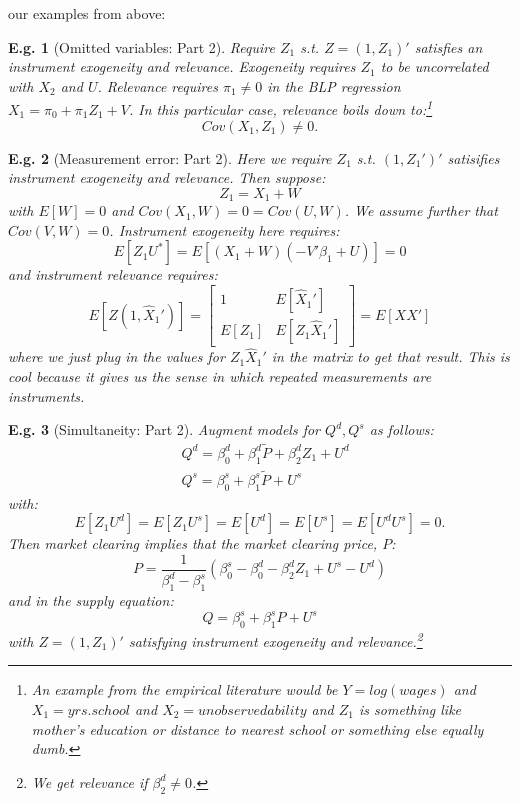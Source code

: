 \documentclass{tufte-book}
\theoremstyle{mytheoremstyle}
\theoremstyle{mylemstyle}
\theoremstyle{mydefstyle}
\newtheorem*{ex}{E.g.}
\begin{document}
 our examples from above:
\begin{ex}[Omitted variables: Part 2] Require \(Z_1\) s.t. \(Z=(1, Z_1)'\) satisfies an instrument exogeneity and relevance. Exogeneity requires \(Z_1\) to be uncorrelated with \(X_2\) and \(U\). Relevance requires \(\pi_1 \ne 0\) in the BLP regression \(X_1 = \pi_0 + \pi_1 Z_1 + V\). In this particular case, relevance boils down to:\footnote{An example from the empirical literature would be \(Y = log(wages)\) and \(X_1 = yrs. school\) and \(X_2 = unobserved ability\) and \(Z_1\) is something like mother's education or distance to nearest school or something else equally dumb.}
	\[Cov(X_1, Z_1) \ne 0 \text{.}\]
\end{ex}
\begin{ex}[Measurement error: Part 2] Here we require \(Z_1\) s.t. \((1,Z_1')'\) satisifies instrument exogeneity and relevance. Then suppose:
	\[Z_1 = X_1 + W\]
with \(E[W] = 0\) and \(Cov(X_1, W) = 0 = Cov(U, W)\). We assume further that \(Cov(V, W) = 0\). Instrument exogeneity here requires:
	\[E[Z_1U^*] = E[(X_1 + W)(-V'\beta_1 + U)] = 0\]
and instrument relevance requires:
	\[E[Z(1, \hat{X}_1')] = \left[ \begin{array}{cc} 1 & E[\hat{X}_1'] \\ E[Z_1] & E[Z_1\hat{X}_1'] \end{array} \right] = E[XX']\]
where we just plug in the values for \(Z_1\hat{X}_1'\) in the matrix to get that result. This is cool because it gives us the sense in which repeated measurements are instruments. 
\end{ex}
\begin{ex}[Simultaneity: Part 2] Augment models for \(Q^d, Q^s\) as follows:
	\begin{align*}
		& Q^d = \beta_0^d + \beta_1^d \tilde{P} + \beta_2^d Z_1 + U^d \\
		& Q^s = \beta_0^s + \beta_1^s \tilde{P} + U^s
	\end{align*}
with:
	\[E[Z_1U^d] = E[Z_1U^s] = E[U^d] = E[U^s] = E[U^d U^s] = 0 \text{.}\]
Then market clearing implies that the market clearing price, \(P\):
	\[P = \frac{1}{\beta_1^d - \beta_1^s}(\beta_0^s - \beta_0^d - \beta_2^dZ_1 + U^s - U^d)\]
and in the supply equation:
	\[Q = \beta_0^s + \beta_1^s P + U^s\]
with \(Z = (1, Z_1)'\) satisfying instrument exogeneity and relevance.\footnote{We get relevance if \(\beta_2^d \ne 0\).}
\end{ex}
\end{document}
